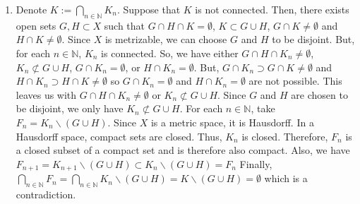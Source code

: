 \documentclass{article}
\newcommand{\N}{\mathbb{N}}
\begin{document}
\begin{enumerate}[label=\alph*)]
\item Denote $K := \bigcap_{n\in\N} K_n$. Suppose that $K$ is not connected. Then, there exists open 
sets $G,H\subset X$ such that $G \cap H \cap K = \emptyset$, $K \subset G \cup H$, $G \cap K \neq 
\emptyset$ and $H \cap K \neq \emptyset$. Since $X$ is metrizable, we can choose $G$ and $H$ to be 
disjoint. But, for each $n\in\N$, $K_n$ is connected. So, we have either $G \cap H \cap K_n \neq \emptyset$, 
$K_n \not\subset G \cup H$, $G \cap K_n = \emptyset$, or $H \cap K_n = \emptyset$. But, $G \cap K_n 
\supset G \cap K \neq \emptyset$ and $H \cap K_n \supset H \cap K \neq \emptyset$ so $G \cap K_n = 
\emptyset$ and $H \cap K_n = \emptyset$ are not possible. This leaves us with $G \cap H \cap K_n \neq 
\emptyset$ or $K_n \not\subset G \cup H$. Since $G$ and $H$ are chosen to be disjoint, we only have 
$K_n \not\subset G \cup H$. For each $n\in\N$, take $F_n = K_n \backslash (G \cup H)$. Since $X$ is a 
metric space, it is Hausdorff. In a Hausdorff space, compact sets are closed. Thus, $K_n$ is closed. 
Therefore, $F_n$ is a closed subset of a compact set and is therefore also compact. Also, 
we have $F_{n+1} = K_{n+1} \backslash (G \cup H) \subset K_{n} \backslash (G \cup H) = F_n$ Finally, 
$\bigcap_{n\in \N} F_n = \bigcap_{n\in \N} K_n \backslash (G \cup H) = K \backslash (G \cup H) 
= \emptyset$ which is a contradiction. 

\end{enumerate}
\end{document}

